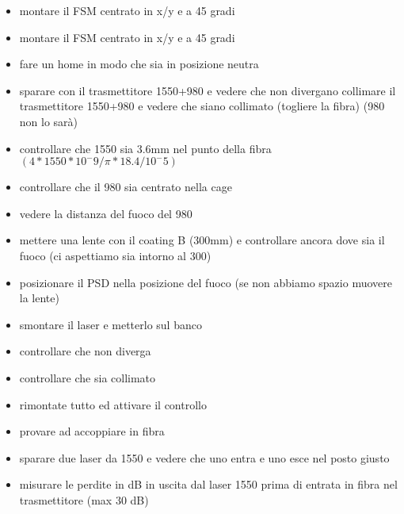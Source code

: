 \begin{itemize}
  \item montare il FSM centrato in x/y e a 45 gradi
\end{itemize}
\begin{itemize}
  \item montare il FSM centrato in x/y e a 45 gradi
  \item fare un home in modo che sia in posizione neutra
  \item sparare con il trasmettitore 1550+980 e vedere che non divergano
        collimare il trasmettitore 1550+980 e vedere che siano collimato (togliere la fibra) (980 non lo sarà)
  \item controllare che 1550 sia 3.6mm nel punto della fibra $(4 * 1550 * 10^-9 / \pi * 18.4 / 10^-5)$
  \item controllare che il 980 sia centrato nella cage
  \item vedere la distanza del fuoco del 980
  \item mettere una lente con il coating B (300mm) e controllare ancora dove sia il fuoco (ci aspettiamo sia intorno al 300)
  \item posizionare il PSD nella posizione del fuoco (se non abbiamo spazio muovere la lente)
  \item smontare il laser e metterlo sul banco
  \item controllare che non diverga
  \item controllare che sia collimato
  \item rimontate tutto ed attivare il controllo
  \item provare ad accoppiare in fibra
  \item sparare due laser da 1550 e vedere che uno entra e uno esce nel posto giusto
  \item misurare le perdite in dB in uscita dal laser 1550 prima di entrata in fibra nel trasmettitore (max 30 dB)
\end{itemize}
